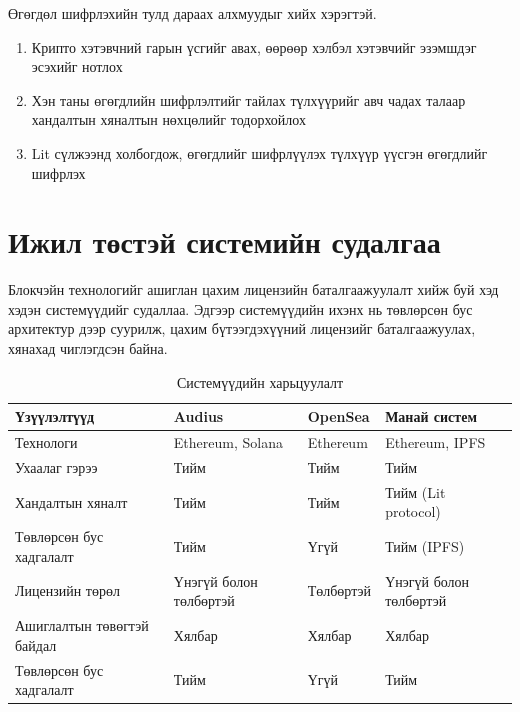 Өгөгдөл шифрлэхийн тулд дараах алхмуудыг хийх хэрэгтэй.
\begin{enumerate}
   \item Крипто хэтэвчний гарын үсгийг авах, өөрөөр хэлбэл хэтэвчийг эзэмшдэг эсэхийг нотлох
   \item Хэн таны өгөгдлийн шифрлэлтийг тайлах түлхүүрийг авч чадах талаар хандалтын хяналтын нөхцөлийг тодорхойлох
   \item Lit сүлжээнд холбогдож, өгөгдлийг шифрлүүлэх түлхүүр үүсгэн өгөгдлийг шифрлэх
\end{enumerate}

\section{Ижил төстэй системийн судалгаа}


Блокчэйн технологийг ашиглан цахим лицензийн баталгаажуулалт хийж буй хэд хэдэн системүүдийг судаллаа. Эдгээр системүүдийн ихэнх нь төвлөрсөн бус архитектур дээр суурилж, цахим бүтээгдэхүүний лицензийг баталгаажуулах, хянахад чиглэгдсэн байна.
\begin{table}[h!]
	\centering
   \begin{tabularx}{\textwidth}{|X|X|X|X|}
		\hline
      \textbf{Үзүүлэлтүүд} & \textbf{Audius} & \textbf{OpenSea} & \textbf{Манай систем}
      \\ \hline Технологи & Ethereum, Solana &	Ethereum &	Ethereum, IPFS
      \\ \hline Ухаалаг гэрээ & 	Тийм & 	Тийм & 	Тийм
      \\ \hline Хандалтын хяналт &	Тийм &	Тийм & Тийм (Lit protocol)
      \\ \hline Төвлөрсөн бус хадгалалт &	Тийм & Үгүй & Тийм (IPFS)
      \\ \hline Лицензийн төрөл & Үнэгүй болон төлбөртэй & Төлбөртэй &	Үнэгүй болон төлбөртэй
      \\ \hline Ашиглалтын төвөгтэй байдал &	Хялбар &	Хялбар &	Хялбар
      \\ \hline Төвлөрсөн бус хадгалалт &	Тийм & Үгүй & Тийм
      \\ \hline
	\end{tabularx}
   \caption{Системүүдийн харьцуулалт}
\end{table}


